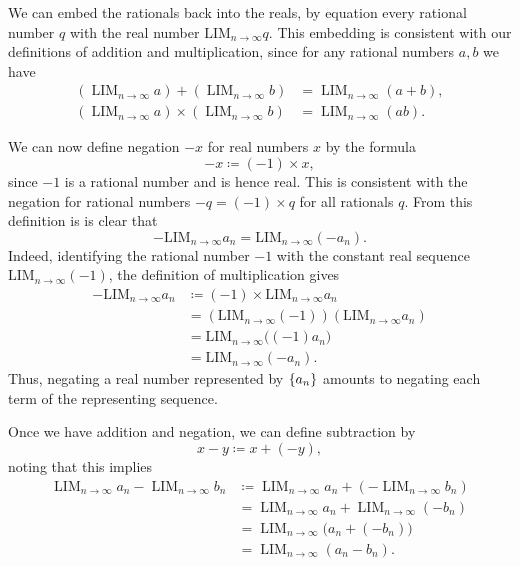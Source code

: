 {We can embed the rationals back into the reals, by equation every rational number $q$ with the real number $\text{LIM}_{n \to \infty} q$.
This embedding is consistent with our definitions of addition and multiplication, since for any rational numbers $a,b$ we have
\begin{align*}
\left(\operatorname{LIM}_{n\to\infty} a\right)
+
\left(\operatorname{LIM}_{n\to\infty} b\right)
&=
\operatorname{LIM}_{n\to\infty}(a+b), \\
\left(\operatorname{LIM}_{n\to\infty} a\right)
\times
\left(\operatorname{LIM}_{n\to\infty} b\right)
&=
\operatorname{LIM}_{n\to\infty}(ab).
\end{align*}

We can now define negation $-x$ for real numbers $x$ by the formula
\begin{equation*}
    -x \coloneqq (-1) \times x,
\end{equation*}
since $-1$ is a rational number and is hence real. This is consistent with the negation for rational numbers $-q=(-1)\times q$ for all rationals $q$. From this definition is is clear that
\begin{equation*}
    - \text{LIM}_{n \to \infty} a_n = \text{LIM}_{n \to \infty} (-a_n).
\end{equation*}
Indeed, identifying the rational number $-1$ with the constant real sequence
$\text{LIM}_{n\to\infty}(-1)$, the definition of multiplication gives
\begin{align*}
-\text{LIM}_{n\to\infty}a_n
&\coloneqq (-1)\times \text{LIM}_{n\to\infty}a_n \\
&=\left(\text{LIM}_{n\to\infty}(-1)\right)
  \left(\text{LIM}_{n\to\infty}a_n\right) \\
&=\text{LIM}_{n\to\infty}\bigl((-1)a_n\bigr) \\
&=\text{LIM}_{n\to\infty}(-a_n).
\end{align*}
Thus, negating a real number represented by $\{a_n\}$ amounts to negating
each term of the representing sequence.

Once we have addition and negation, we can define subtraction by
\begin{equation*}
    x-y \coloneqq x+(-y),
\end{equation*}
noting that this implies
\begin{align*}
\operatorname{LIM}_{n\to\infty} a_n
-
\operatorname{LIM}_{n\to\infty} b_n
&\coloneqq
\operatorname{LIM}_{n\to\infty} a_n
+
\left(
-\operatorname{LIM}_{n\to\infty} b_n
\right) \\
&=
\operatorname{LIM}_{n\to\infty} a_n
+
\operatorname{LIM}_{n\to\infty}(-b_n) \\
&=
\operatorname{LIM}_{n\to\infty}
\bigl(a_n+(-b_n)\bigr) \\
&=
\operatorname{LIM}_{n\to\infty}(a_n-b_n).
\end{align*}

}
